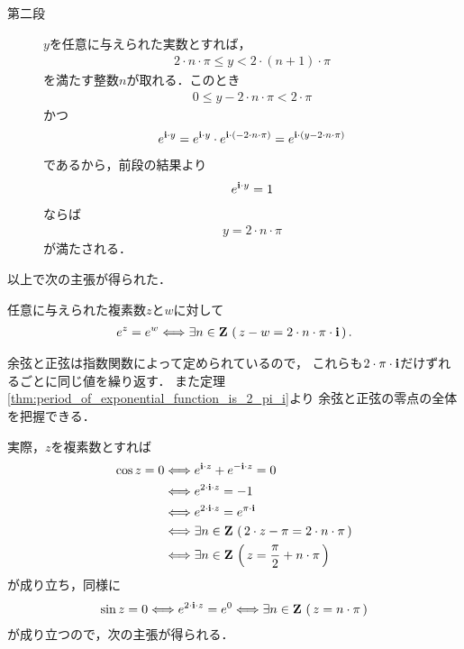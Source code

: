 \begin{sketch}
\begin{description}
			\item[第二段]
				$y$を任意に与えられた実数とすれば，
				\begin{align}
					2 \cdot n \cdot \pi \leq y < 2 \cdot (n+1) \cdot \pi
				\end{align}
				を満たす整数$n$が取れる．このとき
				\begin{align}
					0 \leq y - 2 \cdot n \cdot \pi < 2 \cdot \pi
				\end{align}
				かつ
				\begin{align}
					e^{\mathbf{i} \cdot y}
					= e^{\mathbf{i} \cdot y} \cdot e^{\mathbf{i} \cdot (- 2 \cdot n \cdot \pi)}
					= e^{\mathbf{i} \cdot (y - 2 \cdot n \cdot \pi)}
				\end{align}
				であるから，前段の結果より
				\begin{align}
					e^{\mathbf{i} \cdot y} = 1
				\end{align}
				ならば
				\begin{align}
					y = 2 \cdot n \cdot \pi
				\end{align}
				が満たされる．
				\QED
		\end{description}
	\end{sketch}
	
	以上で次の主張が得られた．
	\begin{screen}
		\begin{thm}
		\label{thm:period_of_exponential_function_is_2_pi_i}
			任意に与えられた複素数$z$と$w$に対して
			\begin{align}
				e^{z} = e^{w} \Longleftrightarrow 
				\exists n \in \mathbf{Z}\, \left(\, z - w = 2 \cdot n \cdot \pi \cdot \mathbf{i}\, \right).
			\end{align}
		\end{thm}
	\end{screen}
	
	余弦と正弦は指数関数によって定められているので，
	これらも$2 \cdot \pi \cdot \mathbf{i}$だけずれるごとに同じ値を繰り返す．
	また定理\ref{thm:period_of_exponential_function_is_2_pi_i}より
	余弦と正弦の零点の全体を把握できる．
	
	実際，$z$を複素数とすれば
	\begin{align}
		\cos{z} = 0 
		&\Longleftrightarrow e^{\mathbf{i} \cdot z} + e^{-\mathbf{i} \cdot z} = 0 \\
		&\Longleftrightarrow e^{2 \cdot \mathbf{i} \cdot z} = -1 \\
		&\Longleftrightarrow e^{2 \cdot \mathbf{i} \cdot z} = e^{\pi \cdot \mathbf{i}} \\
		&\Longleftrightarrow \exists n \in \mathbf{Z}\,
		\left(\, 2 \cdot z - \pi = 2 \cdot n \cdot \pi\, \right) \\
		&\Longleftrightarrow \exists n \in \mathbf{Z}\,
		\left(\, z = \frac{\pi}{2} + n \cdot \pi\, \right)
	\end{align}
	が成り立ち，同様に
	\begin{align}
		\sin{z} = 0
		\Longleftrightarrow e^{2 \cdot \mathbf{i} \cdot z} = e^{0}
		\Longleftrightarrow \exists n \in \mathbf{Z}\, \left(\, z = n \cdot \pi\, \right)
	\end{align}
	が成り立つので，次の主張が得られる．
	
